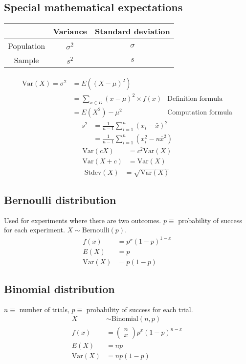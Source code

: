 \documentclass{article}
\newcommand{\var}{\text{Var}}
\newcommand{\bernoulli}{\text{Bernoulli}}
\newcommand{\binomial}{\text{Binomial}}
\newcommand{\stdev}{\text{Stdev}}
\begin{document}
\begin{multicols*}{2}
\subsection{Special mathematical expectations}
\begin{center}
    \begin{tabular}{|c|c|c|}
        \hline
        & Variance & Standard deviation \\ \hline
        Population & $\sigma^2$ & $\sigma$ \\ \hline
        Sample & $s^2$ & $s$ \\ \hline
    \end{tabular}
\end{center}

\begin{align*}
    \var(X) = \sigma^2 &= E((X - \mu)^2) \\
    &= \sum_{x \in D} (x - \mu)^2 \times f(x) & \text{Definition formula} \\
    &= E(X^2) - \mu^2 & \text{Computation formula}
\end{align*}
\begin{align*}
    s^2 &= \frac{1}{n - 1} \sum_{i = 1}^n (x_i - \bar{x})^2 \\
    &= \frac{1}{n - 1} \sum_{i = 1}^n (x_i^2 - n\bar{x}^2)
\end{align*}
\begin{align*}
    \var(cX) &= c^2 \var(X) \\
    \var(X + c) &= \var(X)
\end{align*}
\begin{align*}
    \stdev(X) &= \sqrt{\var(X)}
\end{align*}

\subsection{Bernoulli distribution}

Used for experiments where there are two outcomes. $p \equiv$ probability of success for each experiment. $X \sim \bernoulli(p)$.
\begin{align*}
    f(x) &= p^x (1-p)^{1-x} \\
    E(X) &= p \\
    \var(X) &= p(1-p)
\end{align*}

\subsection{Binomial distribution}
$n \equiv$ number of trials, $p \equiv$ probability of success for each trial.
\begin{align*}
    X &\sim \binomial(n, p) \\
    f(x) &= \begin{pmatrix}
        n \\
        x
    \end{pmatrix} p^x (1-p)^{n-x} \\
    E(X) &= np \\
    \var(X) &= np(1-p)
\end{align*}


\end{multicols*}
\end{document}
